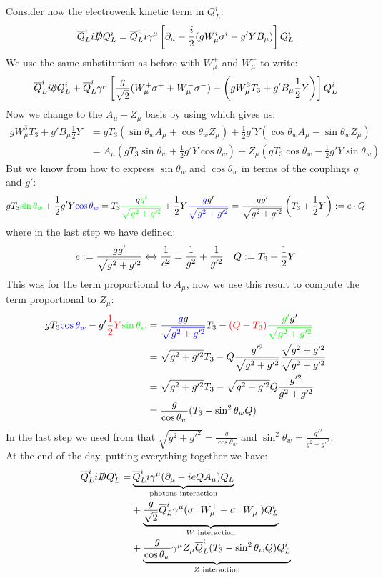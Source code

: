 \documentclass[../main.tex]{subfiles}
\begin{document}
Consider now the electroweak kinetic term in $Q_L^i$:
\[
\overline{Q}_L^ii\slashed{D}Q_L^i=\overline{Q}_L^ii\gamma^\mu\left[\partial_\mu-\frac{i}{2}(gW_\mu^i\sigma^i-g'YB_\mu)\right]Q_L^i
\]
We use the same substitution as before with $W_\mu^+$ and $W_\mu^-$ to write:
\[
\overline{Q}_L^ii\slashed{\partial}Q_L^i+\overline{Q}_L^i\gamma^\mu\left[\frac{g}{\sqrt{2}}(W_\mu^+\sigma^++W_\mu^-\sigma^-)+\left(gW_\mu^3T_3+g'B_\mu \frac{1}{2}Y\right)\right]Q_L^i
\]
Now we change to the $A_\mu-Z_\mu$ basis by using  which gives us:
\begin{align*}
gW_\mu^3T_3+g'B_\mu\frac{1}{2}Y&=gT_3(\sin\theta_wA_\mu+\cos\theta_wZ_\mu)+\frac{1}{2}g'Y(\cos\theta_wA_\mu-\sin\theta_wZ_\mu)\\
&=A_\mu\left(gT_3\sin\theta_w+\frac{1}{2}g'Y\cos\theta_w\right)+Z_\mu\left(gT_3\cos\theta_w-\frac{1}{2}g'Y\sin\theta_w\right)
\end{align*}
But we know from  how to express $\sin\theta_w$ and $\cos\theta_w$ in terms of the couplings $g$ and $g'$:
\[
gT_3{\color{green}\sin\theta_w}+\frac{1}{2}g'Y{\color{blue}\cos\theta_w}=T_3{\color{green}\frac{{\color{black}g}g'}{\sqrt{g^2+g'^2}}}+\frac{1}{2}Y{\color{blue}\frac{g{\color{black}g'}}{\sqrt{g^2+g'^2}}}=\frac{gg'}{\sqrt{g^2+g'^2}}\left(T_3+\frac{1}{2}Y\right):=e\cdot Q
\]
where in the last step we have defined:
\[
e:=\frac{gg'}{\sqrt{g^2+g'^2}}\xleftrightarrow[]{}\frac{1}{e^2}=\frac{1}{g^2}+\frac{1}{g'^2} \quad Q:=T_3+\frac{1}{2}Y
\]
This was for the term proportional to $A_\mu$, now we use this result to compute the term proportional to $Z_\mu$:
\begin{align*}
gT_3{\color{blue}\cos\theta_w}-g'{\color{red}\frac{1}{2}Y}{\color{green}\sin\theta_w}&={\color{blue}\frac{g{\color{black}g}}{\sqrt{g^2+g'^2}}}T_3-{\color{red}(Q-T_3)}{\color{green}\frac{g'{\color{black}g'}}{\sqrt{g^2+g'^2}}}\\
&=\sqrt{g^2+g'^2}T_3-Q\frac{g'^2}{\sqrt{g^2+g'^2}}\frac{\sqrt{g^2+g'^2}}{\sqrt{g^2+g'^2}}\\
&=\sqrt{g^2+g'^2}T_3-\sqrt{g^2+g'^2}Q\frac{g'^2}{g^2+g'^2}\\
&=\frac{g}{\cos\theta_w}(T_3-\sin^2\theta_wQ)
\end{align*}
In the last step we used from  that $\sqrt{g^2+g'^2}=\frac{g}{\cos\theta_w}$ and $\sin^2\theta_w=\frac{g'^2}{g^2+g'^2}$.\\
At the end of the day, putting everything together we have:
\begin{align*}
\overline{Q}_L^ii\slashed{D}Q_L^i=&\underbrace{\overline{Q}_L^ii\gamma^\mu(\partial_\mu-ieQA_\mu)Q_L}_{\text{photons interaction}}\\
&+\underbrace{\frac{g}{\sqrt{2}}\overline{Q}_L^i\gamma^\mu(\sigma^+W_\mu^++\sigma^-W_\mu^-)Q_L^i}_{\text{$W$ interaction}}\\
&+\underbrace{\frac{g}{\cos\theta_w}\gamma^\mu Z_\mu\overline{Q}_L^i(T_3-\sin^2\theta_wQ)Q_L^i}_{\text{$Z$ interaction}}
\end{align*}
\end{document}
